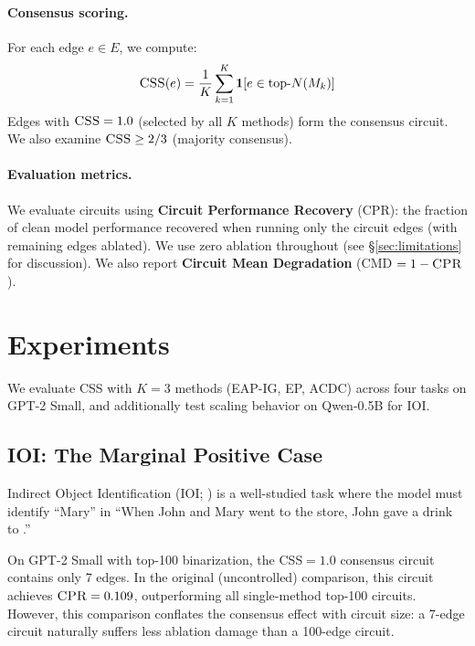 \documentclass[11pt,a4paper]{article}
\newcommand{\css}{\textsc{CSS}}
\newcommand{\cpr}{\textsc{CPR}}
\newcommand{\cmd}{\textsc{CMD}}
\begin{document}
\paragraph{Consensus scoring.}
For each edge $e \in E$, we compute:
\begin{equation}
    \css{}(e) = \frac{1}{K} \sum_{k=1}^{K} \mathbf{1}[e \in \text{top-}N(M_k)]
\end{equation}
Edges with $\css{}=1.0$ (selected by all $K$ methods) form the consensus circuit. We also examine $\css{}\geq 2/3$ (majority consensus).

\paragraph{Evaluation metrics.}
We evaluate circuits using \textbf{Circuit Performance Recovery} (\cpr{}): the fraction of clean model performance recovered when running only the circuit edges (with remaining edges ablated). We use zero ablation throughout (see \S\ref{sec:limitations} for discussion). We also report \textbf{Circuit Mean Degradation} (\cmd{} $= 1 - \cpr{}$).

\section{Experiments}
\label{sec:experiments}

We evaluate \css{} with $K=3$ methods (EAP-IG, EP, ACDC) across four tasks on GPT-2 Small, and additionally test scaling behavior on Qwen-0.5B for IOI.

\subsection{IOI: The Marginal Positive Case}
\label{sec:ioi}

Indirect Object Identification (IOI; \citealp{wang2023interpretability}) is a well-studied task where the model must identify ``Mary'' in ``When John and Mary went to the store, John gave a drink to \underline{\hspace{1em}}.''

On GPT-2 Small with top-100 binarization, the \css{}$=1.0$ consensus circuit contains only 7 edges. In the original (uncontrolled) comparison, this circuit achieves $\cpr{}=0.109$, outperforming all single-method top-100 circuits. However, this comparison conflates the consensus effect with circuit size: a 7-edge circuit naturally suffers less ablation damage than a 100-edge circuit.
\end{document}
